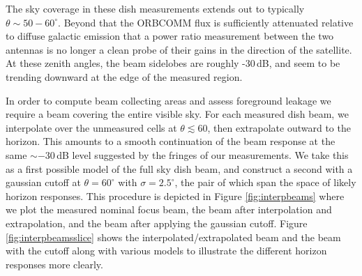 \documentclass{emulateapj}
\begin{document}
The sky coverage in these dish measurements extends out to typically $\theta\sim50-60^\circ$. Beyond that the ORBCOMM flux is sufficiently attenuated relative to diffuse galactic emission that a power ratio measurement between the two antennas is no longer a clean probe of their gains in the direction of the satellite. At these zenith angles, the beam sidelobes are roughly -30\,dB, and seem to be trending downward at the edge of the measured region.





In order to compute beam collecting areas and assess foreground leakage we require a beam covering the entire visible sky. For each measured dish beam, we interpolate over the unmeasured cells at $\theta\lesssim60$, then extrapolate outward to the horizon. This amounts to a smooth continuation of the beam response at the same $\sim-30$\,dB level suggested by the fringes of our measurements. We take this as a first possible model of the full sky dish beam, and construct a second with a gaussian cutoff at $\theta=60^\circ$ with $\sigma=2.5^\circ$, the pair of which span the space of likely horizon responses. This procedure is depicted in Figure \ref{fig:interpbeams} where we plot the measured nominal focus beam, the beam after interpolation and extrapolation, and the beam after applying the gaussian cutoff. Figure \ref{fig:interpbeamsslice} shows the interpolated/extrapolated beam and the beam with the cutoff along with various models to illustrate the different horizon responses more clearly.
\end{document}
